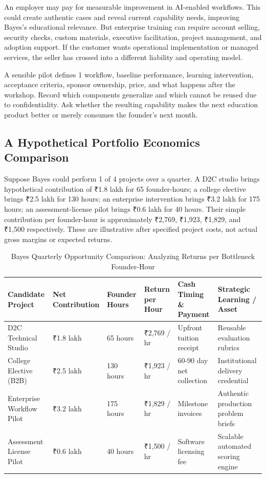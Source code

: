 An employer may pay for measurable improvement in AI-enabled workflows. This could create authentic cases and reveal current capability needs, improving Bayes's educational relevance. But enterprise training can require account selling, security checks, custom materials, executive facilitation, project management, and adoption support. If the customer wants operational implementation or managed services, the seller has crossed into a different liability and operating model.

A sensible pilot defines 1 workflow, baseline performance, learning intervention, acceptance criteria, sponsor ownership, price, and what happens after the workshop. Record which components generalize and which cannot be reused due to confidentiality. Ask whether the resulting capability makes the next education product better or merely consumes the founder's next month.

\subsection{A Hypothetical Portfolio Economics Comparison}
\label{sec:hypothetical_portfolio_economics_bayes}

Suppose Bayes could perform 1 of 4 projects over a quarter. A D2C studio brings hypothetical contribution of ₹1.8 lakh for 65 founder-hours; a college elective brings ₹2.5 lakh for 130 hours; an enterprise intervention brings ₹3.2 lakh for 175 hours; an assessment-license pilot brings ₹0.6 lakh for 40 hours. Their simple contribution per founder-hour is approximately ₹2,769, ₹1,923, ₹1,829, and ₹1,500 respectively. These are illustrative after specified project costs, not actual gross margins or expected returns.

\begin{table}[t]
\centering
\small
\caption{Bayes Quarterly Opportunity Comparison: Analyzing Returns per Bottleneck Founder-Hour}
\label{tab:bayes_opportunity_comparison}
\begin{tabularx}{\textwidth}{l p{2.2cm} p{2cm} p{2.6cm} p{2.8cm} X}
\toprule
\textbf{Candidate Project} & \textbf{Net Contribution} & \textbf{Founder Hours} & \textbf{Return per Hour} & \textbf{Cash Timing \& Payment} & \textbf{Strategic Learning / Asset} \\
\midrule
D2C Technical Studio & ₹1.8 lakh & 65 hours & ₹2,769 / hr & Upfront tuition receipt & Reusable evaluation rubrics \\
\addlinespace[2pt]
College Elective (B2B) & ₹2.5 lakh & 130 hours & ₹1,923 / hr & 60-90 day net collection & Institutional delivery credential \\
\addlinespace[2pt]
Enterprise Workflow Pilot & ₹3.2 lakh & 175 hours & ₹1,829 / hr & Milestone invoices & Authentic production problem briefs \\
\addlinespace[2pt]
Assessment License Pilot & ₹0.6 lakh & 40 hours & ₹1,500 / hr & Software licensing fee & Scalable automated scoring engine \\
\bottomrule
\end{tabularx}
\end{table}

